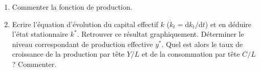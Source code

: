 \documentclass[11pt,a4paper]{article}
\begin{document}
\begin{enumerate}
\item Commenter la fonction de production. %

\item Ecrire l'\'{e}quation d'\'{e}volution du capital effectif $k$ ($\dot{k}%
_{t}=$d$k_{t}/$d$t$) et en d\'{e}duire l'\'{e}tat stationnaire $k^{\ast }$.
Retrouver ce r\'{e}sultat graphiquement. D\'{e}terminer le niveau
correspondant de production effective $y^{\ast }$. Quel est alors le taux de
croissance de la production par t\^{e}te $Y/L$ et de la consommation par t\^{e}te $C/L$? Commenter.






\end{enumerate}
\end{document}
